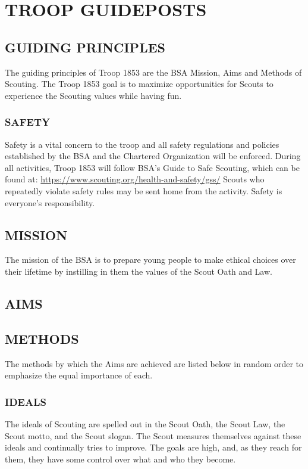 \documentclass{ltxguide}
\begin{document}
\section{TROOP GUIDEPOSTS}
\subsection{GUIDING PRINCIPLES}
The guiding principles of Troop 1853 are the \ac{BSA} Mission, Aims and Methods of Scouting. The Troop 1853 goal is to maximize opportunities for Scouts to experience the Scouting values while having fun.

\subsubsection{SAFETY}
Safety is a vital concern to the troop and all safety regulations and policies established by the \ac{BSA} and the Chartered Organization will be enforced. During all activities, Troop 1853 will follow \ac{BSA}'s Guide to Safe Scouting, which can be found at:  \url{https://www.scouting.org/health-and-safety/gss/}  Scouts who repeatedly violate safety rules may be sent home from the activity. Safety is everyone's responsibility.

\subsection{MISSION}
The mission of the \ac{BSA} is to prepare young people to make ethical choices over their lifetime by instilling in them the values of the Scout Oath and Law.

\subsection{AIMS}

\subsection{METHODS}
The methods by which the Aims are achieved are listed below in random order to emphasize the equal importance of each.

\subsubsection{IDEALS}
The ideals of Scouting are spelled out in the Scout Oath, the Scout Law, the Scout motto, and the Scout slogan. The Scout measures themselves against these ideals and continually tries to improve. The goals are high, and, as they reach for them, they have some control over what and who they become.
\end{document}
